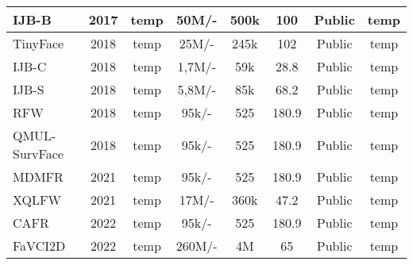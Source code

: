 \documentclass[class=report, crop=false, a4paper, 12pt]{standalone}
\begin{document}
\begin{table}[!ht]
{\begin{tabular}{|l|c|c|c|c|c|c|c|}
    IJB-B~\autocite{whitelamIARPAJanusBenchmarkB2017}                                 & 2017          & temp                  & 50M/-                  & 500k           & 100                   & Public                & temp                 \\ \hline
    TinyFace~\autocite{chengLowResolutionFaceRecognition2019}                               & 2018          & temp                  & 25M/-                  & 245k           & 102                   & Public                & temp                 \\ \hline
    IJB-C~\autocite{mazeIARPAJanusBenchmark2018}                                  & 2018          & temp                  & 1,7M/-                 & 59k            & 28.8                  & Public                & temp                 \\ \hline
    IJB-S~\autocite{kalkaIJBIARPAJanus2018}                                  & 2018          & temp                  & 5,8M/-                 & 85k            & 68.2                  & Public                & temp                 \\ \hline
    RFW~\autocite{wangRacialFacesWild2019}                                    & 2018 & temp                  & 95k/-                  & 525            & 180.9                 & Public                & temp                 \\ \hline          
    QMUL-SurvFace~\autocite{chengSurveillanceFaceRecognition2018}                          & 2018          & temp                  & 95k/-                  & 525            & 180.9                 & Public                & temp                 \\ \hline
    MDMFR~\autocite{ullahNovelDeepMaskNetModel2022}                                  & 2021          & temp                  & 95k/-                  & 525            & 180.9                 & Public                & temp                 \\ \hline
    XQLFW~\autocite{knocheCrossQualityLFWDatabase2021}                                  & 2021          & temp                  & 17M/-                  & 360k           & 47.2                  & Public                & temp                 \\ \hline
    CAFR~\autocite{zhaoAgeInvariantFaceRecognition2022}                                   & 2022          & temp                  & 95k/-                  & 525            & 180.9                 & Public                & temp                 \\ \hline
    FaVCI2D~\autocite{popescuFaceVerificationChallenging2022}                                & 2022          & temp                  & 260M/-                 & 4M             & 65                    & Public                & temp                 \\ \hline
    \end{tabular}%
    }
    \caption{}
    \label{tab:test data}
\end{table}
\end{document}
